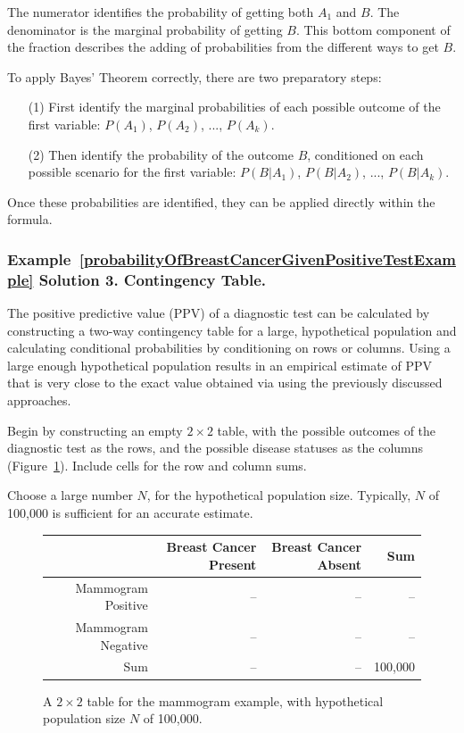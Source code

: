 The numerator identifies the probability of getting both $A_1$ and $B$. The denominator is the marginal probability of getting $B$. This bottom component of the fraction describes the adding of probabilities from the different ways to get $B$. 

To apply Bayes' Theorem correctly, there are two preparatory steps:
\begin{enumerate}
\setlength{\itemsep}{0mm}
\item[(1)] First identify the marginal probabilities of each possible outcome of the first variable: $P(A_1)$, $P(A_2)$, ..., $P(A_k)$.
\item[(2)] Then identify the probability of the outcome $B$, conditioned on each possible scenario for the first variable: $P(B | A_1)$, $P(B | A_2)$, ..., $P(B | A_k)$.
\end{enumerate}
Once these probabilities are identified, they can be applied directly within the formula.


\textD{\newpage}


\subsubsection{Example~\ref{probabilityOfBreastCancerGivenPositiveTestExample} Solution 3. Contingency Table.}

The positive predictive value (PPV) of a diagnostic test can be calculated by constructing a two-way contingency table for a large, hypothetical population and calculating conditional probabilities by conditioning on rows or columns. Using a large enough hypothetical population results in an empirical estimate of PPV that is very close to the exact value obtained via using the previously discussed approaches.

Begin by constructing an empty $2 \times 2$ table, with the possible outcomes of the diagnostic test as the rows, and the possible disease statuses as the columns (Figure~\ref{tableMammogramSetup}). Include cells for the row and column sums.

Choose a large number $N$, for the hypothetical population size. Typically, $N$ of 100,000 is sufficient for an accurate estimate. 

\begin{figure}[ht]
	\centering
	\begin{tabular}{rrrr}
		\hline
		& Breast Cancer Present & Breast Cancer Absent & Sum \\ 
		\hline
		Mammogram Positive & -- & -- & -- \\ 
		Mammogram Negative & -- & -- & -- \\ 
		Sum & -- & -- & 100,000 \\ 
		\hline
	\end{tabular}
	\caption{A $2 \times 2$ table for the mammogram example, with hypothetical population size $N$ of 100,000.}
	\label{tableMammogramSetup}
\end{figure}

